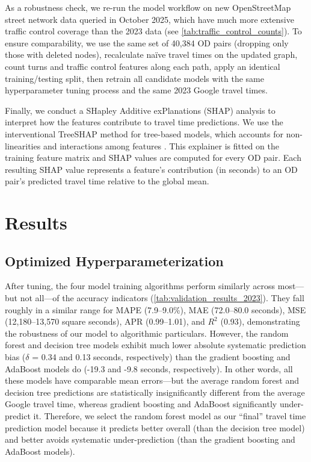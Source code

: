 \documentclass[12pt,letterpaper]{article} %
\begin{document}
As a robustness check, we re-run the model workflow on new OpenStreetMap street network data queried in October 2025, which have much more extensive traffic control coverage than the 2023 data (see \autoref{tab:traffic_control_counts}). To ensure comparability, we use the same set of 40,384 OD pairs (dropping only those with deleted nodes), recalculate naïve travel times on the updated graph, count turns and traffic control features along each path, apply an identical training/testing split, then retrain all candidate models with the same hyperparameter tuning process and the same 2023 Google travel times.

Finally, we conduct a SHapley Additive exPlanations (SHAP) analysis to interpret how the features contribute to travel time predictions. We use the interventional TreeSHAP method for tree-based models, which accounts for non-linearities and interactions among features \citep{lundberg2020local}. This explainer is fitted on the training feature matrix and SHAP values are computed for every OD pair. Each resulting SHAP value represents a feature's contribution (in seconds) to an OD pair's predicted travel time relative to the global mean.

\section{Results}

\subsection{Optimized Hyperparameterization}

After tuning, the four model training algorithms perform similarly across most---but not all---of the accuracy indicators (\autoref{tab:validation_results_2023}). They fall roughly in a similar range for MAPE (7.9--9.0\%), MAE (72.0--80.0 seconds), MSE (12,180--13,570 square seconds), APR (0.99--1.01), and $R^2$ (0.93), demonstrating the robustness of our model to algorithmic particulars. However, the random forest and decision tree models exhibit much lower absolute systematic prediction bias ($\delta$ = 0.34 and 0.13 seconds, respectively) than the gradient boosting and AdaBoost models do (-19.3 and -9.8 seconds, respectively). In other words, all these models have comparable mean errors---but the average random forest and decision tree predictions are statistically insignificantly different from the average Google travel time, whereas gradient boosting and AdaBoost significantly under-predict it. Therefore, we select the random forest model as our \enquote{final} travel time prediction model because it predicts better overall (than the decision tree model) and better avoids systematic under-prediction (than the gradient boosting and AdaBoost models).
\end{document}
